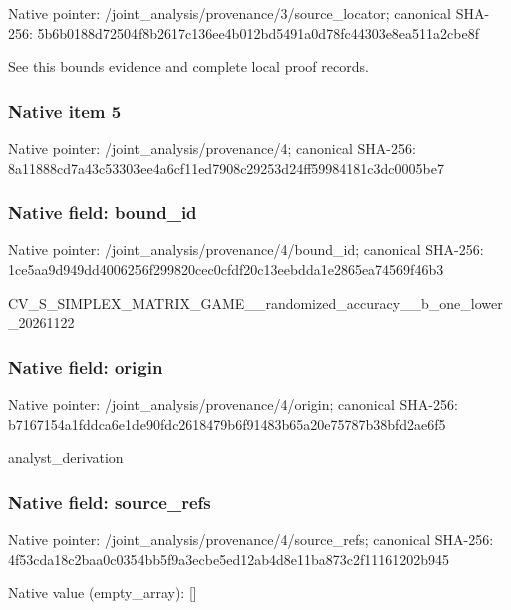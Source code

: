 \documentclass[10pt,a4paper]{article}
\begin{document}
Native pointer: /joint\_analysis/provenan\allowbreak{}ce/3/source\_locator; canonical SHA-256: 5b6b0188d72504f8b2617c13\allowbreak{}6ee4b012bd5491a0d78fc443\allowbreak{}03e8ea511a2cbe8f


See this bounds evidence and complete local proof records.


\subsubsection{Native item 5}


Native pointer: /joint\_analysis/provenance/4; canonical SHA-256: 8a11888cd7a43c53303ee4a6\allowbreak{}cf11ed7908c29253d24ff599\allowbreak{}84181c3dc0005be7



\subsubsection{Native field: bound\_id}


Native pointer: /joint\_analysis/provenance/4/bound\_id; canonical SHA-256: 1ce5aa9d949dd4006256f299\allowbreak{}820cec0cfdf20c13eebdda1e\allowbreak{}2865ea74569f46b3


CV\_S\_SIMPLEX\_MATRIX\_GAME\allowbreak{}\_\_randomized\_accuracy\_\_b\allowbreak{}\_one\_lower\_20261122


\subsubsection{Native field: origin}


Native pointer: /joint\_analysis/provenance/4/origin; canonical SHA-256: b7167154a1fddca6e1de90fd\allowbreak{}c2618479b6f91483b65a20e7\allowbreak{}5787b38bfd2ae6f5


analyst\_derivation


\subsubsection{Native field: source\_refs}


Native pointer: /joint\_analysis/provenan\allowbreak{}ce/4/source\_refs; canonical SHA-256: 4f53cda18c2baa0c0354bb5f\allowbreak{}9a3ecbe5ed12ab4d8e11ba87\allowbreak{}3c2f11161202b945



Native value (empty\_array): []
\end{document}
